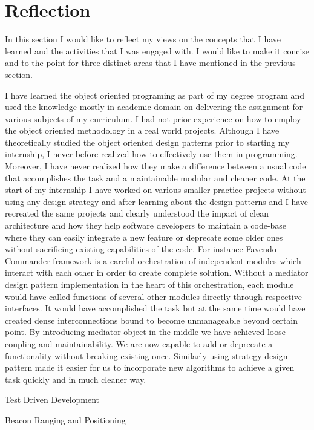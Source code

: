 \section{Reflection}
In this section I would like to reflect my views on the concepts that I have learned and the activities that I was engaged with. I would like to make it concise and to the point for three distinct areas that I have mentioned in the previous section.

\par I have learned the object oriented programing as part of my degree program and used the knowledge mostly in academic domain on delivering the assignment for various subjects of my curriculum. I had not prior experience on how to employ the object oriented methodology in a real world projects. Although I have theoretically studied the object oriented design patterns prior to starting my internship, I never before realized how to effectively use them in programming. Moreover, I have never realized how they make a difference between a usual code that accomplishes the task and a maintainable modular and cleaner code. At the start of my internship I have worked on various smaller practice projects without using any design strategy and after learning about the design patterns and I have recreated the same projects and clearly understood the impact of clean architecture and how they help software developers to maintain a code-base where they can easily integrate a new feature or deprecate some older ones without sacrificing existing capabilities of the code. For instance Favendo Commander framework is a careful orchestration of independent modules which interact with each other in order to create complete solution. Without a mediator design pattern implementation in the heart of this orchestration,  each module would have called functions of several other modules directly through respective interfaces. It would have accomplished the task but at the same time would have created dense interconnections bound to become unmanageable beyond certain point. By introducing mediator object in the middle we have achieved loose coupling and maintainability. We are now capable to add or deprecate a functionality without breaking existing once. Similarly using strategy design pattern made it easier for us to incorporate new algorithms to achieve a given task quickly and in much cleaner way.

\par Test Driven Development

\par Beacon Ranging and Positioning